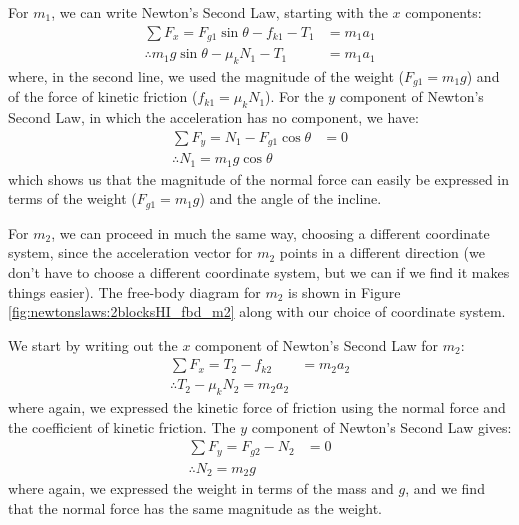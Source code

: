 \begin{example}

For $m_1$, we can write Newton's Second Law, starting with the $x$ components:
\begin{align*}
\sum F_x = F_{g1}\sin\theta-f_{k1}-T_1&=m_1a_1\\
\therefore m_1 g\sin\theta -\mu_k N_1 - T_1 &= m_1 a_1
\end{align*}
where, in the second line, we used the magnitude of the weight ($F_{g1}=m_1g$) and of the force of kinetic friction ($f_{k1}=\mu_kN_1$). For the $y$ component of Newton's Second Law, in which the acceleration has no component, we have:
\begin{align*}
\sum F_y = N_1 - F_{g1}\cos\theta &= 0\\
\therefore N_1=m_1g\cos\theta
\end{align*}
which shows us that the magnitude of the normal force can easily be expressed in terms of the weight ($F_{g1}=m_1g$) and the angle of the incline.

For $m_2$, we can proceed in much the same way, choosing a different coordinate system, since the acceleration vector for $m_2$ points in a different direction (we don't have to choose a different coordinate system, but we can if we find it makes things easier). The free-body diagram for $m_2$ is shown in Figure \ref{fig:newtonslaws:2blocksHI_fbd_m2} along with our choice of coordinate system.


We start by writing out the $x$ component of Newton's Second Law for $m_2$:
\begin{align*}
\sum F_x = T_2 - f_{k2} &= m_2 a_2\\
\therefore T_2 - \mu_k N_2 = m_2 a_2
\end{align*}
where again, we expressed the kinetic force of friction using the normal force and the coefficient of kinetic friction. The $y$ component of Newton's Second Law gives:
\begin{align*}
\sum F_y = F_{g2}-N_2 &=0\\
\therefore N_2 = m_2g
\end{align*}
where again, we expressed the weight in terms of the mass and $g$, and we find that the normal force has the same magnitude as the weight. 


\end{example}
